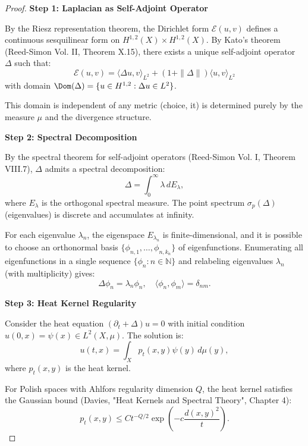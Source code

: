 \begin{proof}

\textbf{Step 1: Laplacian as Self-Adjoint Operator}

By the Riesz representation theorem, the Dirichlet form $\mathcal{E}(u, v)$ defines a continuous sesquilinear form on $H^{1,2}(X) \times H^{1,2}(X)$. By Kato's theorem (Reed-Simon Vol. II, Theorem X.15), there exists a unique self-adjoint operator $\Delta$ such that:
\begin{equation}
\mathcal{E}(u, v) = \langle \Delta u, v \rangle_{L^2} + (1 + \|\Delta\|) \langle u, v \rangle_{L^2}
\end{equation}
with domain $\Dom(\Delta) = \{u \in H^{1,2} : \Delta u \in L^2\}$.

This domain is independent of any metric (choice, it) is determined purely by the measure $\mu$ and the divergence structure.

\textbf{Step 2: Spectral Decomposition}

By the spectral theorem for self-adjoint operators (Reed-Simon Vol. I, Theorem VIII.7), $\Delta$ admits a spectral decomposition:
\begin{equation}
\Delta = \int_0^\infty \lambda \, dE_\lambda,
\end{equation}
where $E_\lambda$ is the orthogonal spectral measure. The point spectrum $\sigma_p(\Delta)$ (eigenvalues) is discrete and accumulates at infinity.

For each eigenvalue $\lambda_n$, the eigenspace $E_{\lambda_n}$ is finite-dimensional, and it is possible to choose an orthonormal basis $\{\phi_{n,1}, \ldots, \phi_{n,k_n}\}$ of eigenfunctions. Enumerating all eigenfunctions in a single sequence $\{\phi_n : n \in \mathbb{N}\}$ and relabeling eigenvalues $\lambda_n$ (with multiplicity) gives:
\begin{equation}
\Delta \phi_n = \lambda_n \phi_n, \quad \langle \phi_n, \phi_m \rangle = \delta_{nm}.
\end{equation}

\textbf{Step 3: Heat Kernel Regularity}

Consider the heat equation $(\partial_t + \Delta) u = 0$ with initial condition $u(0, x) = \psi(x) \in L^2(X, \mu)$. The solution is:
\begin{equation}
u(t, x) = \int_X p_t(x, y) \psi(y) \, d\mu(y),
\end{equation}
where $p_t(x, y)$ is the heat kernel.

For Polish spaces with Ahlfors regularity dimension $Q$, the heat kernel satisfies the Gaussian bound (Davies, "Heat Kernels and Spectral Theory", Chapter 4):
\begin{equation}
p_t(x, y) \leq C t^{-Q/2} \exp\left(-c \frac{d(x,y)^2}{t}\right).
\end{equation}


\end{proof}
